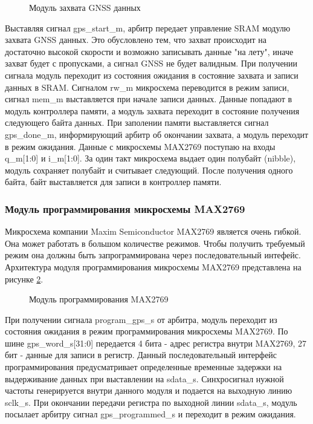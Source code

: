 \begin{figure}[H]
\begin{center}
\end{center}
\caption{Модуль захвата GNSS данных}
\label{pic:gps_main_arch}
\end{figure}

Выставляя сигнал gps\_start\_m, арбитр передает управление SRAM модулю захвата GNSS данных. Это обусловлено тем, что захват 
происходит на достаточно высокой скорости и возможно записывать данные "на лету", иначе захват будет с пропусками, а сигнал GNSS
не будет валидным. При получении сигнала модуль переходит из состояния ожидания в состояние захвата и записи данных в SRAM. 
Сигналом rw\_m микросхема переводится в режим записи, сигнал mem\_m выставляется при начале записи данных. Данные попадают
в модуль контроллера памяти, а модуль захвата переходит в состояние получения следующего байта данных. При заполении памяти
выставляется сигнал gps\_done\_m, информирующий арбитр об окончании захвата, а модуль переходит в режим ожидания. Данные с
микросхемы MAX2769 поступаю на входы q\_m[1:0] и i\_m[1:0]. За один такт микросхема выдает один полубайт (nibble), модуль
сохраняет полубайт и считывает следующий. После получения одного байта, байт выставляется для записи в контроллер памяти.

\subsubsection{Модуль программирования микросхемы MAX2769}
\label{sec:gps_program}
Микросхема компании Maxim Semiconductor MAX2769 является очень гибкой. Она может работать в большом количестве режимов.
Чтобы получить требуемый режим она должны быть запрограммирована через последовательный интефейс. Архитектура модуля
программирования микросхемы MAX2769 представлена на рисунке \ref{pic:gps_program}.

\begin{figure}[H]
\begin{center}
\end{center}
\caption{Модуль программирования MAX2769}
\label{pic:gps_program}
\end{figure}

При получении сигнала program\_gps\_s от арбитра, модуль переходит из состояния ожидания в режим программирования микросхемы
MAX2769. По шине gps\_word\_s[31:0] передается 4 бита - адрес регистра внутри MAX2769, 27 бит - данные для записи в регистр.
Данный последовательный интерфейс программирования предусматривает определенные временные задержки на выдерживание данных
при выставлении на sdata\_s. Синхросигнал нужной частоты генерируется внутри данного модуля и подается на выходную линию sclk\_s.
При окончании передачи регистра по выходной линии sdata\_s, модуль посылает арбитру сигнал gps\_programmed\_s и переходит в режим
ожидания.


